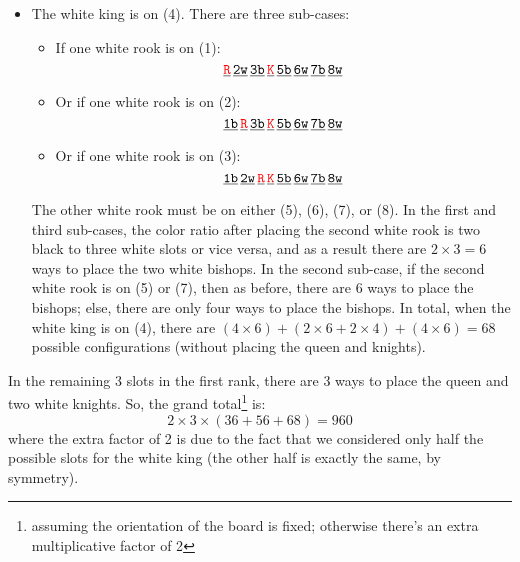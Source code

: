 \documentclass[11pt]{article}
\begin{document}
\begin{itemize}
	
	\item The white king is on (4).  There are three sub-cases:
	\begin{itemize}
		\item If one white rook is on (1):
		\begin{equation*}
		\underline{\texttt{\textcolor{red}{R}}}\,
		\underline{\texttt{2w}}\,
		\underline{\texttt{3b}}\,
		\underline{\texttt{\textcolor{red}{K}}}\,
		\underline{\texttt{5b}}\,
		\underline{\texttt{6w}}\,
		\underline{\texttt{7b}}\,
		\underline{\texttt{8w}}
		\end{equation*}
		
		
		\item Or if one white rook is on (2):
		\begin{equation*}
		\underline{\texttt{1b}}\,
		\underline{\texttt{\textcolor{red}{R}}}\,
		\underline{\texttt{3b}}\,
		\underline{\texttt{\textcolor{red}{K}}}\,
		\underline{\texttt{5b}}\,
		\underline{\texttt{6w}}\,
		\underline{\texttt{7b}}\,
		\underline{\texttt{8w}}
		\end{equation*}
		
		
		\item Or if one white rook is on (3):
		\begin{equation*}
		\underline{\texttt{1b}}\,
		\underline{\texttt{2w}}\,
		\underline{\texttt{\textcolor{red}{R}}}\,
		\underline{\texttt{\textcolor{red}{K}}}\,
		\underline{\texttt{5b}}\,
		\underline{\texttt{6w}}\,
		\underline{\texttt{7b}}\,
		\underline{\texttt{8w}}
		\end{equation*}
	\end{itemize}
	The other white rook must be on either (5), (6), (7), or (8). In the first and third sub-cases, the color ratio after placing the second white rook is two black to three white slots or vice versa, and as a result there are $2\times 3 = 6$ ways to place the two white bishops. In the second sub-case, if the second white rook is on (5) or (7), then as before, there are 6 ways to place the bishops; else, there are only four ways to place the bishops. In total, when the white king is on (4), there are $(4\times 6) + (2\times6 + 2\times4) + (4\times 6) = \boxed{68}$ possible configurations (without placing the queen and knights).
\end{itemize}


In the remaining 3 slots in the first rank, there are 3 ways to place the queen and two white knights. So, the grand total\footnote{assuming the orientation of the board is fixed; otherwise there's an extra multiplicative factor of 2} is:
\begin{equation*}
2 \times 3\times(36+56+68) = \boxed{960}
\end{equation*}
where the extra factor of 2 is due to the fact that we considered only half the possible slots for the white king (the other half is exactly the same, by symmetry).
\end{document}
